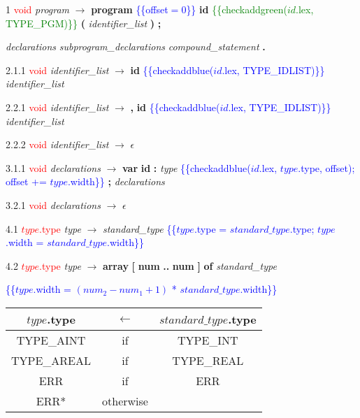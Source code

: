 \documentclass[10pt]{article}
\begin{document}
 1    \textcolor{red}{void} \emph{program} $\rightarrow$ \textbf{program} \textcolor{blue}{\{\{offset$ = 0$\}\}} \textbf{id} \textcolor{green}{\{\{checkaddgreen($id$.lex, TYPE_PGM)\}\}} \textbf{(} \emph{identifier\_list} \textbf{)} \textbf{;}

 \emph{declarations} \emph{subprogram\_declarations}  \emph{compound\_statement} \textbf{.}


2.1.1  \textcolor{red}{void} \emph{identifier\_list} $\rightarrow$ \textbf{id} \textcolor{blue}{\{\{checkaddblue($id$.lex, TYPE_IDLIST)\}\}} \emph{identifier\_list\textprime}

2.2.1  \textcolor{red}{void} \emph{identifier\_list\textprime} $\rightarrow$ \textbf{,} \textbf{id} \textcolor{blue}{\{\{checkaddblue($id$.lex, TYPE_IDLIST)\}\}} \emph{identifier\_list\textprime}

2.2.2  \textcolor{red}{void} \emph{identifier\_list\textprime} $\rightarrow$ $\epsilon$

3.1.1  \textcolor{red}{void} \emph{declarations} $\rightarrow$ \textbf{var} \textbf{id} \textbf{:} \emph{type} \textcolor{blue}{\{\{checkaddblue($id$.lex, $type$.type, offset); offset += $type$.width\}\}} \textbf{;} \emph{declarations}

3.2.1 \textcolor{red}{void} \emph{declarations} $\rightarrow$ $\epsilon$

4.1  \textcolor{red}{$type$.type} \emph{type} $\rightarrow$ \emph{standard\_type} \textcolor{blue}{\{\{$type$.type = $standard\_type$.type; $type$.width = $standard\_type$.width\}\}}

4.2  \textcolor{red}{$type$.type} \emph{type} $\rightarrow$ \textbf{array} \textbf{[} \textbf{num} \textbf{..} \textbf{num} \textbf{]} \textbf{of} \emph{standard\_type}

\textcolor{blue}{\{\{$type$.width = $(num_2 - num_1 + 1)$ * $standard\_type$.width\}\}}

\begin{tabular}[t]{|ccc|}

  \hline

  $type$.type & \textbf{$\leftarrow$} & $standard\_type$.type \\

  \hline
                                                                                                                                              TYPE_AINT & if & TYPE_INT\\
  TYPE_AREAL & if & TYPE_REAL \\

  ERR & if & ERR \\

  ERR* & otherwise & \\

  \hline

                                                                                                                                            \end{tabular}
\end{document}

